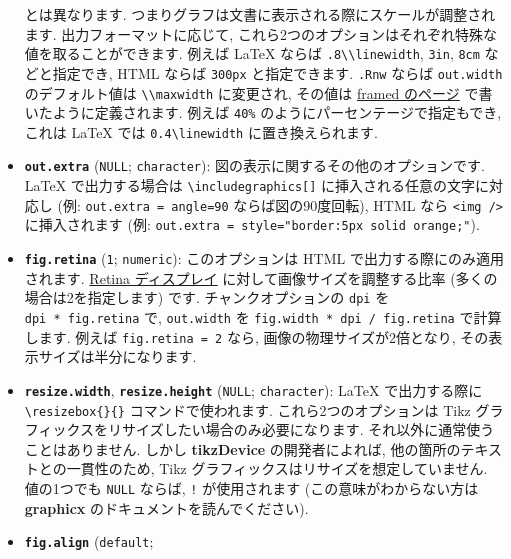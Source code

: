 \documentclass[
  lualatex,ja=standard,jafont=noto-otf]{bxjsreport}
\begin{document}
\begin{itemize}
  とは異なります.
  つまりグラフは文書に表示される際にスケールが調整されます.
  出力フォーマットに応じて,
  これら2つのオプションはそれぞれ特殊な値を取ることができます. 例えば
  LaTeX ならば \texttt{.8\textbackslash{}\textbackslash{}linewidth},
  \texttt{3in}, \texttt{8cm} などと指定でき, HTML ならば \texttt{300px}
  と指定できます. \texttt{.Rnw} ならば \texttt{out.width}
  のデフォルト値は \texttt{\textbackslash{}\textbackslash{}maxwidth}
  に変更され, その値は \protect\hyperlink{framed}{framed のページ}
  で書いたように定義されます. 例えば
  \texttt{\textquotesingle{}40\%\textquotesingle{}}
  のようにパーセンテージで指定もでき, これは LaTeX では
  \texttt{0.4\textbackslash{}linewidth} に置き換えられます.
\item
  \textbf{\texttt{out.extra}} (\texttt{NULL}; \texttt{character}):
  図の表示に関するその他のオプションです. LaTeX で出力する場合は
  \texttt{\textbackslash{}includegraphics{[}{]}}
  に挿入される任意の文字に対応し (例:
  \texttt{out.extra\ =\ \textquotesingle{}angle=90\textquotesingle{}}
  ならば図の90度回転), HTML なら
  \texttt{\textless{}img\ /\textgreater{}} に挿入されます (例:
  \texttt{out.extra\ =\ \textquotesingle{}style="border:5px\ solid\ orange;"\textquotesingle{}}).
\item
  \textbf{\texttt{fig.retina}} (\texttt{1}; \texttt{numeric}):
  このオプションは HTML で出力する際にのみ適用されます.
  \href{https://ja.wikipedia.org/wiki/Retina\%E3\%83\%87\%E3\%82\%A3\%E3\%82\%B9\%E3\%83\%97\%E3\%83\%AC\%E3\%82\%A4}{Retina
  ディスプレイ} に対して画像サイズを調整する比率
  (多くの場合は2を指定します) です. チャンクオプションの \texttt{dpi} を
  \texttt{dpi\ *\ fig.retina} で, \texttt{out.width} を
  \texttt{fig.width\ *\ dpi\ /\ fig.retina} で計算します. 例えば
  \texttt{fig.retina\ =\ 2} なら, 画像の物理サイズが2倍となり,
  その表示サイズは半分になります.
\item
  \textbf{\texttt{resize.width}}, \textbf{\texttt{resize.height}}
  (\texttt{NULL}; \texttt{character}): LaTeX で出力する際に
  \texttt{\textbackslash{}resizebox\{\}\{\}} コマンドで使われます.
  これら2つのオプションは Tikz
  グラフィックスをリサイズしたい場合のみ必要になります.
  それ以外に通常使うことはありません. しかし \textbf{tikzDevice}
  の開発者によれば, 他の箇所のテキストとの一貫性のため, Tikz
  グラフィックスはリサイズを想定していません. 値の1つでも \texttt{NULL}
  ならば, \texttt{!} が使用されます (この意味がわからない方は
  \textbf{graphicx} のドキュメントを読んでください).
\item
  \textbf{\texttt{fig.align}}
  (\texttt{\textquotesingle{}default\textquotesingle{}};

\end{itemize}
\end{document}
